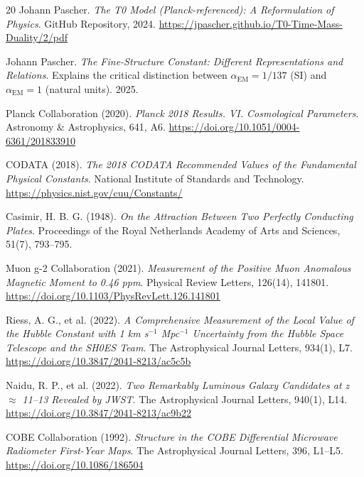 	
	\begin{thebibliography}{20}
		Johann Pascher.
		\textit{The T0 Model (Planck-referenced): A Reformulation of Physics}.
		GitHub Repository, 2024.
		\url{https://jpascher.github.io/T0-Time-Mass-Duality/2/pdf}
		
		Johann Pascher.
		\textit{The Fine-Structure Constant: Different Representations and Relations}.
		Explains the critical distinction between $\alpha_{\text{EM}} = 1/137$ (SI) and $\alpha_{\text{EM}} = 1$ (natural units).
		2025.
		
		Planck Collaboration (2020). 
		\textit{Planck 2018 Results. VI. Cosmological Parameters}. 
		Astronomy \& Astrophysics, 641, A6. 
		\url{https://doi.org/10.1051/0004-6361/201833910}
		
		CODATA (2018). 
		\textit{The 2018 CODATA Recommended Values of the Fundamental Physical Constants}. 
		National Institute of Standards and Technology. 
		\url{https://physics.nist.gov/cuu/Constants/}
		
		Casimir, H. B. G. (1948). 
		\textit{On the Attraction Between Two Perfectly Conducting Plates}. 
		Proceedings of the Royal Netherlands Academy of Arts and Sciences, 51(7), 793--795.
		
		Muon g-2 Collaboration (2021). 
		\textit{Measurement of the Positive Muon Anomalous Magnetic Moment to 0.46 ppm}. 
		Physical Review Letters, 126(14), 141801. 
		\url{https://doi.org/10.1103/PhysRevLett.126.141801}
		
		Riess, A. G., et al. (2022). 
		\textit{A Comprehensive Measurement of the Local Value of the Hubble Constant with 1 km s$^{-1}$ Mpc$^{-1}$ Uncertainty from the Hubble Space Telescope and the SH0ES Team}. 
		The Astrophysical Journal Letters, 934(1), L7. 
		\url{https://doi.org/10.3847/2041-8213/ac5c5b}
		
		Naidu, R. P., et al. (2022). 
		\textit{Two Remarkably Luminous Galaxy Candidates at z $\approx$ 11--13 Revealed by JWST}. 
		The Astrophysical Journal Letters, 940(1), L14. 
		\url{https://doi.org/10.3847/2041-8213/ac9b22}
		
		COBE Collaboration (1992). 
		\textit{Structure in the COBE Differential Microwave Radiometer First-Year Maps}. 
		The Astrophysical Journal Letters, 396, L1--L5. 
		\url{https://doi.org/10.1086/186504}
	\end{thebibliography}
